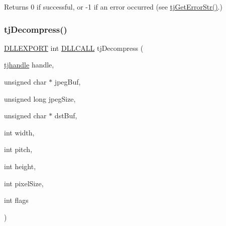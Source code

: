 \begin{DoxyReturn}{Returns}
0 if successful, or -\/1 if an error occurred (see \hyperlink{group___turbo_j_p_e_g_ga9af79c908ec131b1ae8d52fe40375abf}{tj\+Get\+Error\+Str()}.) 
\end{DoxyReturn}
\mbox{\label{group___turbo_j_p_e_g_ga5809053e92c9655b70c848eb3b91f6cb}} 
\subsubsection{\texorpdfstring{tj\+Decompress()}{tjDecompress()}}
{\footnotesize\ttfamily \hyperlink{turbojpeg_8h_a808e08638be3cba36e36759e5b150de0}{D\+L\+L\+E\+X\+P\+O\+RT} int \hyperlink{turbojpeg_8h_a54b25836118bfac94a53a7b790f3ccb2}{D\+L\+L\+C\+A\+LL} tj\+Decompress (\begin{DoxyParamCaption}\item[{\hyperlink{group___turbo_j_p_e_g_ga758d2634ecb4949de7815cba621f5763}{tjhandle}}]{handle,  }\item[{unsigned char $\ast$}]{jpeg\+Buf,  }\item[{unsigned long}]{jpeg\+Size,  }\item[{unsigned char $\ast$}]{dst\+Buf,  }\item[{int}]{width,  }\item[{int}]{pitch,  }\item[{int}]{height,  }\item[{int}]{pixel\+Size,  }\item[{int}]{flags }\end{DoxyParamCaption})}

\mbox{\label{group___turbo_j_p_e_g_gada69cc6443d1bb493b40f1626259e5e9}} 
